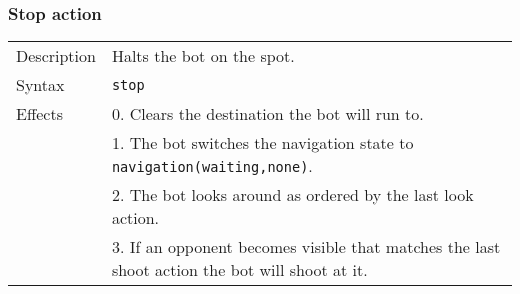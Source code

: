 \documentclass[11pt,a4paper]{article}
\begin{document}
\subsubsection*{Stop action}
\begin{small}
\begin{tabular}{p{2cm}p{9cm}}
Description & Halts the bot on the spot.\\ 
Syntax & \verb|stop|\\
Effects 
	&	0.	Clears the destination the bot will run to. \\
	&	1.	The bot switches the navigation state to \verb|navigation(waiting,none)|. \\
	&	2.	The bot looks around as ordered by the last look action.\\
	&	3.	If an opponent becomes visible that matches the last shoot action the bot will shoot at it.
\end{tabular}
\end{small}
\end{document}
